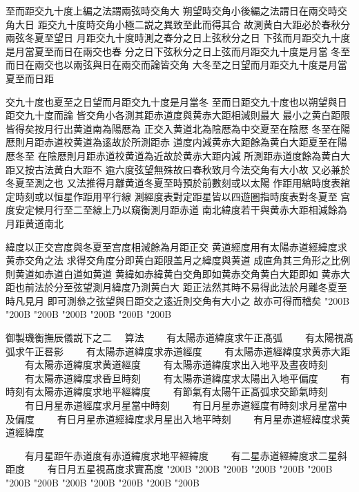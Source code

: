 \begin{正文}
至而距交九十度上編之法謂兩弦時交角大
朔望時交角小後編之法謂日在兩交時交角大日
距交九十度時交角小極二説之異致至此而得其合
故測黄白大距必於春秋分兩弦冬夏至望日
月距交九十度時測之春分之日上弦秋分之日
下弦而月距交九十度是月當夏至而日在兩交也春
分之日下弦秋分之日上弦而月距交九十度是月當
冬至而日在兩交也以兩弦與日在兩交而論皆交角
大冬至之日望而月距交九十度是月當夏至而日距
\par
交九十度也夏至之日望而月距交九十度是月當冬
至而日距交九十度也以朔望與日距交九十度而論
皆交角小各測其距赤道度與黄赤大距相減則最大
最小之黄白距限皆得矣按月行出黄道南為陽厯為
正交入黄道北為陰厯為中交夏至在陰厯
冬至在陽厯則月距赤道校黄道為逺故於所測距赤
道度内減黄赤大距餘為黄白大距夏至在陽厯冬至
在陰厯則月距赤道校黄道為近故於黄赤大距内減
所測距赤道度餘為黄白大距又按古法黄白大距不
逾六度弦望無殊故曰春秋致月今法交角有大小故
又必兼於冬夏至測之也
又法推得月離黄道冬夏至時預於前數刻或以太陽
作距用綰時度表綰定時刻或以恒星作距用平行線
測經度表對定距星皆以四遊圏指時度表對冬夏至
宫度安定候月行至二至線上乃以窺衡測月距赤道
南北緯度若干與黄赤大距相減餘為月距黄道南北
\par
緯度以正交宫度與冬夏至宫度相減餘為月距正交
黄道經度用有太陽赤道經緯度求黄赤交角之法
求得交角度分即黄白距限盖月之緯度與黄道
成直角其三角形之比例則黄道如赤道白道如黄道
黄緯如赤緯黄白交角即如黄赤交角黄白大距即如
黄赤大距也前法於分至弦望測月緯度乃測黄白大
距正法然其時不易得此法於月離冬夏至時凡見月
即可測叅之弦望與日距交之逺近則交角有大小之
故亦可得而稽矣
\char"200B\relax{}
\char"200B\relax{}
\char"200B\relax{}
\char"200B\relax{}
\char"200B\relax{}
\char"200B\relax{}
\char"200B\relax
\par
御製璣衡撫辰儀説下之二
　算法
　　有太陽赤道緯度求午正髙弧
　　有太陽視髙弧求午正晷影
　　有太陽赤道緯度求赤道經度
　　有太陽赤道經緯度求黄赤大距
　　有太陽赤道緯度求黄道經度
　　有太陽赤道緯度求出入地平及晝夜時刻
　　有太陽赤道緯度求昏旦時刻
　　有太陽赤道緯度求太陽出入地平偏度
　　有時刻有太陽赤道緯度求地平經緯度
　　有節氣有太陽午正髙弧求交節氣時刻
　　有日月星赤道經度求月星當中時刻
　　有日月星赤道經度有時刻求月星當中及偏度
　　有日月星赤道經緯度求月星出入地平時刻
　　有月星赤道經緯度求黄道經緯度
\par
　　有月星距午赤道度有赤道緯度求地平經緯度
　　有二星赤道經緯度求二星斜距度
　　有日月五星視髙度求實髙度
\char"200B\relax{}
\char"200B\relax{}
\char"200B\relax{}
\char"200B\relax{}
\char"200B\relax{}
\char"200B\relax{}
\char"200B\relax{}
\char"200B\relax{}
\char"200B\relax{}
\char"200B\relax{}
\char"200B\relax{}
\char"200B\relax{}
\char"200B\relax
\par
\end{正文}\clearpage
